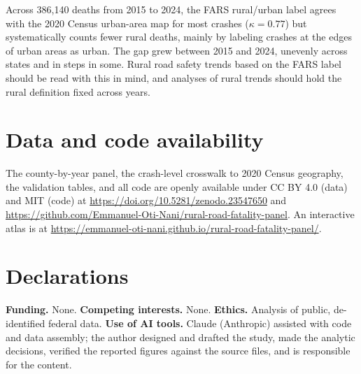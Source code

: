 \documentclass[12pt]{article}
\begin{document}
Across 386{,}140 deaths from 2015 to 2024, the FARS rural/urban label agrees with the 2020 Census urban-area map for most crashes ($\kappa = 0.77$) but systematically counts fewer rural deaths, mainly by labeling crashes at the edges of urban areas as urban. The gap grew between 2015 and 2024, unevenly across states and in steps in some. Rural road safety trends based on the FARS label should be read with this in mind, and analyses of rural trends should hold the rural definition fixed across years.

\section*{Data and code availability}

The county-by-year panel, the crash-level crosswalk to 2020 Census geography, the validation tables, and all code are openly available under CC BY 4.0 (data) and MIT (code) at \url{https://doi.org/10.5281/zenodo.23547650} and \url{https://github.com/Emmanuel-Oti-Nani/rural-road-fatality-panel}. An interactive atlas is at \url{https://emmanuel-oti-nani.github.io/rural-road-fatality-panel/}.

\section*{Declarations}

\textbf{Funding.} None. \textbf{Competing interests.} None. \textbf{Ethics.} Analysis of public, de-identified federal data. \textbf{Use of AI tools.} Claude (Anthropic) assisted with code and data assembly; the author designed and drafted the study, made the analytic decisions, verified the reported figures against the source files, and is responsible for the content.
\end{document}
